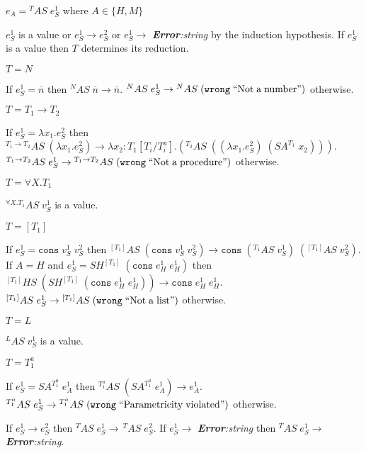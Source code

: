 \begin{case}
\label{as}
$e_{A}={^{T}A}S\;e_{S}^{1}$ where $A\in\lbrace H,M\rbrace$

$e_{S}^{1}$ is a value or $e_{S}^{1}\rightarrow e_{S}^{2}$ or $e_{S}^{1}\rightarrow$ \emph{\textbf{Error}:\;string} by the induction hypothesis.  If $e_{S}^{1}$ is a value then $T$ determines its reduction.
\begin{subcase}
$T=N$

If $e_{S}^{1}=\overline{n}$ then $^{N}AS\;\overline{n}\rightarrow\overline{n}$.  $^{N}AS\;e_{S}^{1}\rightarrow{^{N}A}S\;(\mathtt{wrong}\;\mathrm{``Not\;a\;number"})$ otherwise.
\end{subcase}
\begin{subcase}
$T=T_{1}\rightarrow T_{2}$

If $e_{S}^{1}=\lambda x_{1}.e_{S}^{2}$ then $^{T_{1}\rightarrow T_{2}}AS\;(\lambda x_{1}.e_{S}^{2})\rightarrow\lambda x_{2}:T_{1}[T_{i}/T^{a}_{i}].(^{T_{2}}AS\;((\lambda x_{1}.e_{S}^{2})\;(SA^{T_{1}}\;x_{2})))$.  $^{T_{1}\rightarrow T_{2}}AS\;e_{S}^{1}\rightarrow{^{T_{1}\rightarrow T_{2}}A}S\;(\mathtt{wrong}\;\mathrm{``Not\;a\;procedure"})$ otherwise.
\end{subcase}
\begin{subcase}
$T=\forall X.T_{1}$

$^{\forall X.T_{1}}AS\;v_{S}^{1}$ is a value.
\end{subcase}
\begin{subcase}
$T=[T_{1}]$

If $e_{S}^{1}=\mathtt{cons}\;v_{S}^{1}\;v_{S}^{2}$ then $^{[T_{1}]}AS\;(\mathtt{cons}\;v_{S}^{1}\;v_{S}^{2})\rightarrow\mathtt{cons}\;(^{T_{1}}AS\;v_{S}^{1})\;(^{[T_{1}]}AS\;v_{S}^{2})$.  If $A=H$ and $e_{S}^{1}=SH^{[T_{1}]}\;(\mathtt{cons}\;e_{H}^{1}\;e_{H}^{1})$ then $^{[T_{1}]}HS\;(SH^{[T_{1}]}\;(\mathtt{cons}\;e_{H}^{1}\;e_{H}^{1}))\rightarrow\mathtt{cons}\;e_{H}^{1}\;e_{H}^{1}$.  $^{[T_{1}]}AS\;e_{S}^{1}\rightarrow{^{[T_{1}]}A}S\;(\mathtt{wrong}\;\mathrm{``Not\;a\;list"})$ otherwise.
\end{subcase}
\begin{subcase}
$T=L$

$^{L}AS\;v_{S}^{1}$ is a value.
\end{subcase}
\begin{subcase}
$T=T_{1}^{a}$

If $e_{S}^{1}=SA^{T_{1}^{a}}\;e_{A}^{1}$ then $^{T_{1}^{a}}AS\;(SA^{T_{1}^{a}}\;e_{A}^{1})\rightarrow e_{A}^{1}$.  $^{T_{1}^{a}}AS\;e_{S}^{1}\rightarrow{^{T_{1}^{a}}A}S\;(\mathtt{wrong}\;\mathrm{``Parametricity\;violated"})$ otherwise.
\end{subcase}
If $e_{S}^{1}\rightarrow e_{S}^{2}$ then $^{T}AS\;e_{S}^{1}\rightarrow\,^{T}AS\;e_{S}^{2}$.  If $e_{S}^{1}\rightarrow$ \emph{\textbf{Error}:\;string} then $^{T}AS\;e_{S}^{1}\rightarrow$ \emph{\textbf{Error}:\;string}.
\end{case}